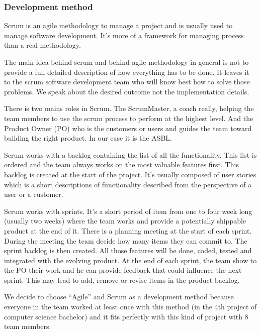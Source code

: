 \iffalse
\subsubsection{Development method}
Scrum is an agile methodology to manage a project and is usually used to manage software development. It's more of a framework for managing process than a real methodology.\newline

The main idea behind scrum and behind agile methodology in general is not to provide a full detailed description of how everything has to be done. It leaves it to the scrum software development team who will know best how to solve those problems. We speak about the desired outcome not the implementation details.\newline

There is two mains roles in Scrum. The ScrumMaster, a coach really, helping the team members to use the scrum process to perform at the highest level. And the Product Owner (PO) who is the customers or users and guides the team toward building the right product. In our case it is the ASBL.\newline

Scrum works with a backlog containing the list of all the functionality. This list is ordered and the team always works on the most valuable features first. This backlog is created at the start of the project. It's usually composed of user stories which is a short descriptions of functionality described from the perspective of a user or a customer.\newline

Scrum works with sprints. It's a short period of item from one to four week long (usually two weeks) where the team works and provide a potentially shippable product at the end of it. There is a planning meeting at the start of each sprint. During the meeting the team decide how many items they can commit to. The sprint backlog is then created. All those features will be done, coded, tested and integrated with the evolving product. At the end of each sprint, the team show to the PO their work and he can provide feedback that could influence the next sprint. This may lead to add, remove or revise items in the product backlog.\newline

We decide to choose \enquote{Agile} and Scrum as a development method because
everyone in the team worked at least once with this method (in the 4th
project of computer science bachelor) and it fits perfectly with this
kind of project with 8 team members.\newline

